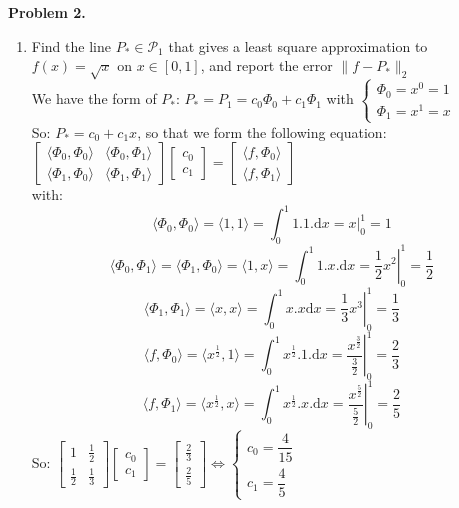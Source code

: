 \documentclass[14pt,a4paper]{article}
\begin{document}
\label{Problem 2}
\large\textbf{Problem 2.} 
\begin{enumerate}
	\label{2a} 
	\item Find the line $P_* \in \mathcal{P}_1$ that gives a least square approximation to $f(x) = \sqrt{x}$ on $x \in [0,1]$, and report the error $\|f-P_*\|_2$\\
	We have the form of $P_*$: $P_* = P_1 = c_0\Phi_0 + c_1\Phi_1$ with $\begin{cases} \Phi_0 = x^0 = 1 \\ \Phi_1 = x^1 = x \end{cases}$ \\
	So: $P_* = c_0 + c_1x$, so that we form the following equation: \\
	\hspace*{2cm} $\begin{bmatrix} \langle\Phi_0,\Phi_0\rangle & \langle\Phi_0,\Phi_1\rangle \\ \langle\Phi_1,\Phi_0\rangle & \langle\Phi_1,\Phi_1\rangle \end{bmatrix} \begin{bmatrix} c_0\\c_1 \end{bmatrix}  = \begin{bmatrix} \langle f,\Phi_0\rangle \\ \langle f,\Phi_1\rangle \end{bmatrix}  $ \\
	with: $$ \langle\Phi_0,\Phi_0\rangle = \langle 1,1 \rangle = \int_{0}^{1}1.1.\mathrm{d}x = \left. x\right|_0^1 = 1$$
	$$ \langle\Phi_0,\Phi_1\rangle = \langle\Phi_1,\Phi_0\rangle = \langle 1,x \rangle = \int_{0}^{1}1.x.\mathrm{d}x = \left.\dfrac{1}{2} x^2\right|_0^1 = \dfrac{1}{2}$$
	$$ \langle\Phi_1,\Phi_1\rangle = \langle x,x \rangle = \int_{0}^{1}x.x\mathrm{d}x = \left. \dfrac{1}{3}x^3\right|_0^1 = \dfrac{1}{3}$$
	$$ \langle f,\Phi_0 \rangle = \langle x^{\frac{1}{2}},1 \rangle = \int_{0}^{1}x^{\frac{1}{2}}.1.\mathrm{d}x = \left.\dfrac{x^{\frac{3}{2}}}{\frac{3}{2}}\right|_0^1 = \dfrac{2}{3} $$ 
	$$ \langle f,\Phi_1 \rangle = \langle x^{\frac{1}{2}},x \rangle = \int_{0}^{1}x^{\frac{1}{2}}.x.\mathrm{d}x = \left.\dfrac{x^{\frac{5}{2}}}{\frac{5}{2}}\right|_0^1 = \dfrac{2}{5} $$ 
	So: $\begin{bmatrix} 1& \frac{1}{2} \\ \frac{1}{2} & \frac{1}{3} \end{bmatrix} \begin{bmatrix} c_0\\c_1 \end{bmatrix} = \begin{bmatrix} \frac{2}{3} \\ \frac{2}{5} \end{bmatrix} \Leftrightarrow \begin{cases} c_0 = \dfrac{4}{15} \\ c_1 = \dfrac{4}{5} \end{cases} $ \\

\end{enumerate}
\end{document}
